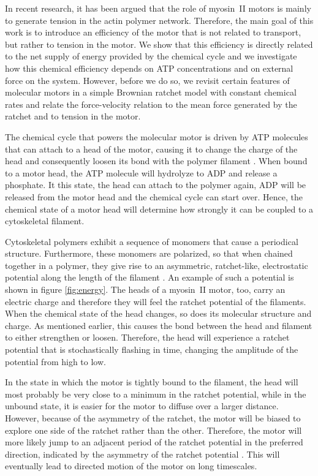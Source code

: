 \documentclass[aps,pre,twocolumn,showpacs,showkeys,superscriptaddress,floatfix]{revtex4-1}
\begin{document}
In recent research, it has been argued that the role of myosin~II motors is mainly to generate tension in the actin polymer network\cite{ma2012nonmuscle,chugh2017actin,monier2010actomyosin}.
Therefore, the main goal of this work is to introduce an efficiency of the motor that is not related to transport, but rather to tension in the motor.
We show that this efficiency is directly related to the net supply of energy provided by the chemical cycle 
and we investigate how this chemical efficiency depends on ATP concentrations and on external force on the system.
However, before we do so, we revisit certain features of molecular motors in a simple Brownian ratchet model\cite{reimann2002brownian} with constant chemical rates and relate the force-velocity relation to the mean force generated by the ratchet and to tension in the motor.

The chemical cycle that powers the molecular motor is driven by ATP molecules that can attach to a head of the motor, causing it to change the charge of the head and consequently loosen its bond with the polymer filament \cite{adelstein1980regulation}. 
When bound to a motor head, the ATP molecule will hydrolyze to ADP and release a phosphate\cite{gajewski1986thermodynamics}. 
It this state, the head can attach to the polymer again, ADP will be released from the motor head and the chemical cycle can start over. 
Hence, the chemical state of a motor head will determine how strongly it can be coupled to a cytoskeletal filament\cite{Nie2014,nie2014conformational}. 


Cytoskeletal polymers exhibit a sequence of monomers that cause a periodical structure\cite{yogurtcu2012mechanochemical}. 
Furthermore, these monomers are polarized, so that when chained together in a polymer, they give rise to an asymmetric, ratchet-like, electrostatic potential along the length of the filament \cite{Nie2014,nie2014conformational}. 
An example of such a potential is shown in figure \ref{fig:energy}. 
The heads of a myosin~II motor, too, carry an electric charge\cite{barterls1993myosin} and therefore they will feel the ratchet potential of the filaments. 
When the chemical state of the head changes, so does its molecular structure and charge. 
As mentioned earlier, this causes the bond between the head and filament to either strengthen or loosen. 
Therefore, the head will experience a ratchet potential that is stochastically flashing in time, changing the amplitude of the potential from high to low.


In the state in which the motor is tightly bound to the filament, the head will most probably be very close to a minimum in the ratchet potential, 
while in the unbound state, it is easier for the motor to diffuse over a larger distance. 
However, because of the asymmetry of the ratchet, the motor will be biased to explore one side of the ratchet rather than the other. 
Therefore, the motor will more likely jump to an adjacent period of the ratchet potential in the preferred direction, indicated by the asymmetry of the ratchet potential \cite{reimann2002brownian}.
This will eventually lead to directed motion of the motor on long timescales\cite{Reimann2002introduction}. 
\end{document}
